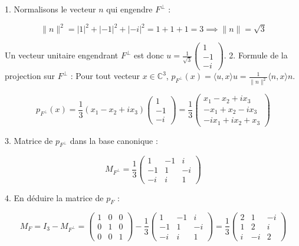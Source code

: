 \documentclass[french]{yLectureNote}
\begin{document}
1. Normalisons le vecteur $n$ qui engendre $F^\perp$ :

$$\|n\|^2 = |1|^2 + |-1|^2 + |-i|^2 = 1 + 1 + 1 = 3 \implies \|n\| = \sqrt{3}$$



Un vecteur unitaire engendrant $F^\perp$ est donc $u = \frac{1}{\sqrt{3}}\begin{pmatrix} 1 \\ -1 \\ -i \end{pmatrix}$.
2. Formule de la projection sur $F^\perp$ :
Pour tout vecteur $x \in \mathbb{C}^3$, $p_{F^\perp}(x) = \langle u, x \rangle u = \frac{1}{\|n\|^2} \langle n, x \rangle n$.

$$p_{F^\perp}(x) = \frac{1}{3} (x_1 - x_2 + ix_3) \begin{pmatrix} 1 \\ -1 \\ -i \end{pmatrix} = \frac{1}{3} \begin{pmatrix} x_1 - x_2 + ix_3 \\ -x_1 + x_2 - ix_3 \\ -ix_1 + ix_2 + x_3 \end{pmatrix}$$


3. Matrice de $p_{F^\perp}$ dans la base canonique :

$$M_{F^\perp} = \frac{1}{3} \begin{pmatrix} 1 & -1 & i \\ -1 & 1 & -i \\ -i & i & 1 \end{pmatrix}$$


4. En déduire la matrice de $p_F$ :

$$M_F = I_3 - M_{F^\perp} = \begin{pmatrix} 1 & 0 & 0 \\ 0 & 1 & 0 \\ 0 & 0 & 1 \end{pmatrix} - \frac{1}{3} \begin{pmatrix} 1 & -1 & i \\ -1 & 1 & -i \\ -i & i & 1 \end{pmatrix} = \frac{1}{3} \begin{pmatrix} 2 & 1 & -i \\ 1 & 2 & i \\ i & -i & 2 \end{pmatrix}$$
\end{document}
